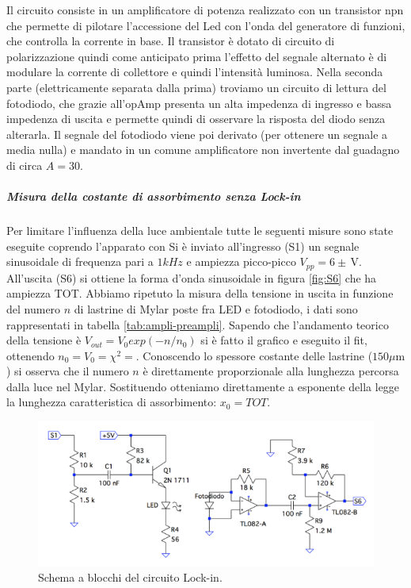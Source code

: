 \documentclass[10pt,a4paper]{article}
\begin{document}
Il circuito consiste in un amplificatore di potenza realizzato con un transistor npn che permette di pilotare l'accessione del Led con l'onda del generatore di funzioni, che controlla la corrente in base.
Il transistor è dotato di circuito di polarizzazione quindi come anticipato prima l'effetto del segnale alternato è di modulare la corrente di collettore e quindi l'intensità luminosa.
Nella seconda parte (elettricamente separata dalla prima) troviamo un  circuito di lettura del fotodiodo, che grazie all'opAmp presenta un alta impedenza di ingresso e bassa impedenza di uscita e permette quindi di osservare la risposta del diodo senza alterarla.
Il segnale del fotodiodo viene poi derivato (per ottenere un segnale a media nulla) e mandato in un comune amplificatore non invertente dal guadagno di circa $A = 30$.\\

\subparagraph{Misura della costante di assorbimento senza Lock-in}
Per limitare l'influenza della luce ambientale tutte le seguenti misure sono state eseguite coprendo l'apparato con %
Si è inviato all'ingresso (S1) un segnale sinusoidale di frequenza pari a $1 kHz$ e ampiezza picco-picco $V_{pp}= 6 \pm \,\mbox{V}$. All'uscita (S6) si ottiene la forma d'onda sinusoidale in figura \ref{fig:S6} che ha ampiezza TOT. Abbiamo ripetuto la misura della tensione in uscita in funzione del numero $n$ di lastrine di Mylar poste fra LED e fotodiodo, i dati sono rappresentati in tabella \ref{tab:ampli-preampli}. Sapendo che l'andamento teorico della tensione è $V_{out}=V_0exp(-n/n_0)$ si è fatto il grafico e eseguito il fit, ottenendo $n_0= V_0= \chi^2=$. Conoscendo lo spessore costante delle lastrine ($150\mu \mbox{m}$) si osserva che il numero $n$ è direttamente proporzionale alla lunghezza percorsa dalla luce nel Mylar. Sostituendo otteniamo direttamente a esponente della legge la lunghezza caratteristica di assorbimento: $x_0= TOT$.

\begin{figure}[!htb]
  \centering
  \includegraphics[scale=0.75]{ampli-preampli.png}
\caption{Schema a blocchi del circuito Lock-in.\label{fig:ampli-preampli}}
\end{figure}
\end{document}
